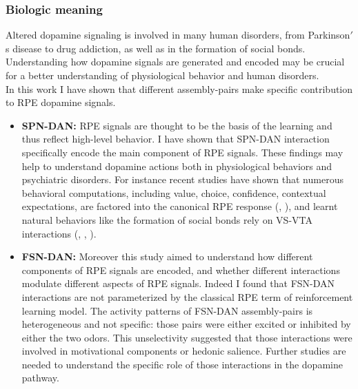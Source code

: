 \subsubsection{Biologic meaning}
Altered dopamine signaling is involved in many human disorders, from Parkinson$'$s disease to drug addiction, as well as in the formation of social bonds. Understanding how dopamine signals are generated and encoded may be crucial for a better understanding of physiological behavior and human disorders.\\In this work I have shown that different assembly-pairs make specific contribution to RPE dopamine signals.
\begin{itemize}
    \item \textbf{SPN-DAN:} RPE signals are thought to be the basis of the learning and thus reflect high-level behavior. I have shown that SPN-DAN interaction specifically encode the main component of RPE signals. These findings may help to understand dopamine actions both in physiological behaviors and psychiatric disorders. For instance recent studies have shown that numerous behavioral computations, including value, choice, confidence, contextual expectations, are factored into the canonical RPE response (\cite{Gadagkar}, \cite{Stauffer}), and learnt natural behaviors like the formation of social bonds rely on VS-VTA interactions (\cite{Nestler}, \cite{Ungless2004}, \cite{Walum}). 
    \item \textbf{FSN-DAN:} Moreover this study aimed to understand how different components of RPE signals are encoded, and whether different interactions modulate different aspects of RPE signals. Indeed I found that FSN-DAN interactions are not parameterized by the classical RPE term of reinforcement learning model. The activity patterns of FSN-DAN assembly-pairs is heterogeneous and not specific: those pairs were either excited or inhibited by either the two odors. This unselectivity suggested that those interactions were involved in motivational components or hedonic salience. Further studies are needed to understand the specific role of those interactions in the dopamine pathway.
\end{itemize}
  